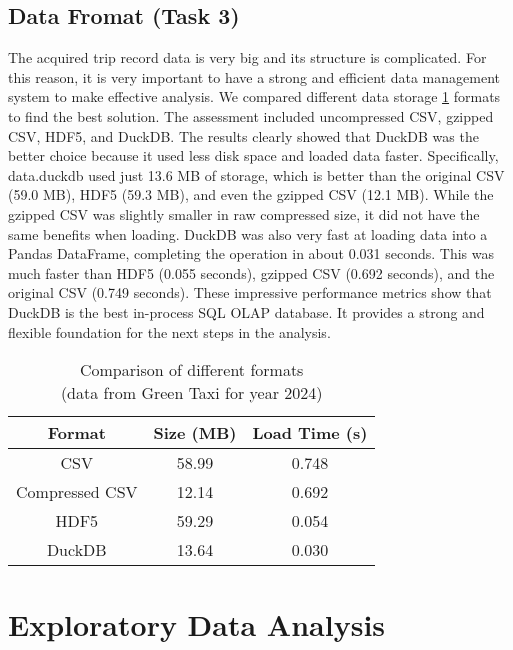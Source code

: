 \documentclass[conference]{IEEEtran}
\begin{document}
\subsection{Data Fromat (Task 3)}

The acquired trip record data is very big and its structure is complicated. For this reason, it is very important to
have a strong and efficient data management system to make effective analysis. We compared different data storage \ref{tab:diff-formats}
formats to find the best solution. The assessment included uncompressed CSV, gzipped CSV, HDF5, and DuckDB.
The results clearly showed that DuckDB was the better choice because it used less disk space and loaded data faster.
Specifically, data.duckdb used just 13.6 MB of storage, which is better than the original CSV (59.0 MB), HDF5 (59.3 MB),
and even the gzipped CSV (12.1 MB). While the gzipped CSV was slightly smaller in raw compressed size, it did not have
the same benefits when loading. DuckDB was also very fast at loading data into a Pandas DataFrame, completing the
operation in about 0.031 seconds. This was much faster than HDF5 (0.055 seconds), gzipped CSV (0.692 seconds), and the
original CSV (0.749 seconds). These impressive performance metrics show that DuckDB is the best in-process SQL OLAP
database. It provides a strong and flexible foundation for the next steps in the analysis.

\begin{table}[]
  \label{tab:diff-formats}
  \caption{ Comparison of different formats \\ (data from Green Taxi for year 2024) }
  \centering
  \begin{tabular}{ccc}
    \textbf{Format}& \textbf{Size (MB)}& \textbf{Load Time (s)}\\
    \hline \hline
    CSV&58.99& 0.748\\
    Compressed CSV&12.14& 0.692\\
    HDF5&59.29& 0.054\\
    DuckDB&13.64& 0.030\\
    \hline
  \end{tabular}
\end{table}


\section{Exploratory Data Analysis}
\end{document}
